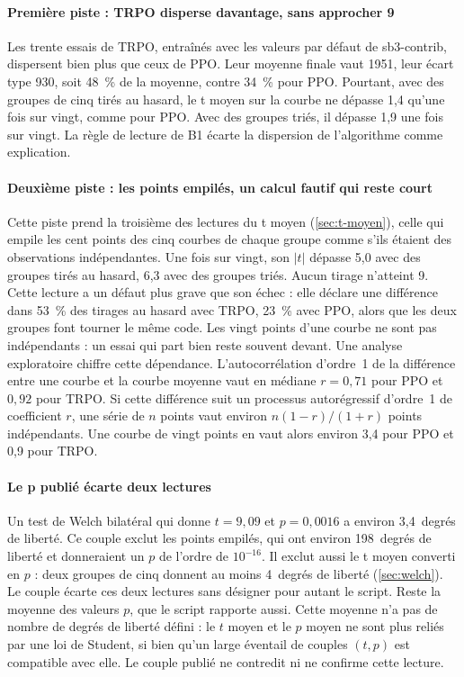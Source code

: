\paragraph{Première piste : TRPO disperse davantage, sans approcher 9}
Les trente essais de TRPO, entraînés avec les valeurs par défaut de sb3-contrib, dispersent bien plus que ceux
de PPO. Leur moyenne finale vaut \num{1951}, leur écart type 930, soit 48~\% de la moyenne, contre 34~\% pour
PPO. Pourtant, avec des groupes de cinq tirés au hasard, le t moyen sur la courbe ne dépasse 1,4 qu'une fois
sur vingt, comme pour PPO. Avec des groupes triés, il dépasse 1,9 une fois sur vingt. La règle de lecture de B1
écarte la dispersion de l'algorithme comme explication.

\paragraph{Deuxième piste : les points empilés, un calcul fautif qui reste court}
Cette piste prend la troisième des lectures du t moyen (\cref{sec:t-moyen}), celle qui empile les cent points
des cinq courbes de chaque groupe comme s'ils étaient des observations indépendantes. Une fois sur vingt, son $|t|$ dépasse 5,0 avec des groupes tirés au hasard, 6,3
avec des groupes triés. Aucun tirage n'atteint 9. Cette lecture a un défaut plus grave que son échec : elle
déclare une différence dans 53~\% des tirages au hasard avec TRPO, 23~\% avec PPO, alors que les deux groupes
font tourner le même code. Les vingt points d'une courbe ne sont pas indépendants : un essai qui part bien reste
souvent devant. Une analyse exploratoire chiffre cette dépendance. L'autocorrélation
d'ordre~1 de la différence entre une courbe et la courbe moyenne vaut en médiane $r = 0{,}71$ pour PPO et
$0{,}92$ pour TRPO. Si cette différence suit un processus autorégressif d'ordre~1 de coefficient $r$, une série
de $n$ points vaut environ $n(1-r)/(1+r)$ points indépendants. Une courbe de vingt points en vaut alors environ
3,4 pour PPO et 0,9 pour TRPO.

\paragraph{Le p publié écarte deux lectures}
Un test de Welch bilatéral qui donne $t=9{,}09$ et $p=0{,}0016$ a environ 3,4~degrés de liberté. Ce couple
exclut les points empilés, qui ont environ 198~degrés de liberté et donneraient un $p$ de l'ordre de
$10^{-16}$. Il exclut aussi le t moyen converti en $p$ : deux groupes de cinq donnent au moins 4~degrés de
liberté (\cref{sec:welch}). Le couple écarte ces deux lectures sans désigner pour autant le script. Reste la
moyenne des valeurs $p$, que le script rapporte aussi. Cette moyenne n'a pas de nombre de degrés de liberté
défini : le $t$ moyen et le $p$ moyen ne sont plus reliés par une loi de Student, si bien qu'un large éventail
de couples $(t, p)$ est compatible avec elle. Le couple publié ne contredit ni ne confirme cette lecture.

